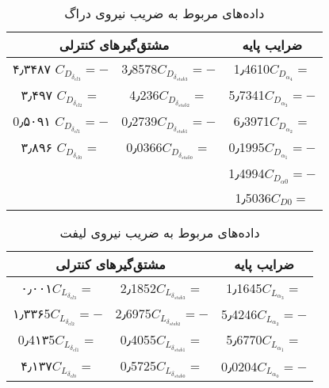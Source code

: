 \begin{table}
	\centering%
	\caption{داده‌های مربوط به ضریب نیروی دراگ}\label{داده‌های مربوط به ضریب نیروی دراگ}
	\begin{tabular}{ |c|c|c| }
		\hline
		\multicolumn{2}{|c|}{مشتق‌گیرهای کنترلی} &ضرایب پایه \\ \hline
		۴٫۳۴۸۷ $C_{D_{\delta_{el3}}}=-$ & 3٫8578$C_{D_{\delta_{stab3}}}=-$ & 1٫4610$C_{D_{\alpha_{4}}}= $\\
		\hline
		۳٫۴۹۷ $C_{D_{\delta_{el2}}}=$ & 4٫236$C_{D_{\delta_{stab2}}}=$& 5٫7341$C_{D_{\alpha_{3}}}=-$\\
		\hline
		0٫۵۰۹۱ $C_{D_{\delta_{el1}}}=-$ & 0٫2739$C_{D_{\delta_{stab1}}}=-$ &6٫3971$C_{D_{\alpha_{2}}}= $\\
		\hline
		۳٫۸۹۶ $C_{D_{\delta_{el0}}}=$  & 0٫0366$C_{D_{\delta_{stab0}}}=$ & 0٫1995$C_{D_{\alpha_{1}}}=-$\\
		\hline
		& & 1٫4994$C_{D_{\alpha0}}=-$\\
		\hline
		& & 1٫5036$C_{D0}=$\\
		\hline
	\end{tabular}
\end{table}
\begin{table}
	\centering%
	\caption{داده‌های مربوط به ضریب نیروی لیفت }\label{داده‌های مربوط به ضریب نیروی لیفت  }
	\begin{tabular}{|c |c|c| }
		\hline
		\multicolumn{2}{|c|}{مشتق‌گیرهای کنترلی} & ضرایب پایه \\ \hline
		۰٫۰۰۱$C_{L_{\delta_{el3}}}=$ & 2٫1852$C_{L_{\delta_{stab3}}}=$& 1٫1645$C_{L_{\alpha_{3}}}=$\\
		\hline
		۱٫۳۳۶5$C_{L_{\delta_{el2}}}=-$ & 2٫6975$C_{L_{\delta_{stab2}}}=-$ &5٫4246$C_{L_{\alpha_{2}}}=-$\\
		\hline
		0٫4۱۳5$C_{L_{\delta_{el1}}}=$ & 0٫4055$C_{L_{\delta_{stab1}}}=$ & 5٫6770$C_{L_{\alpha_{1}}}=$\\
		\hline
		۴٫۱۳۷$ C_{L_{\delta_{el0}}}=$ & 0٫5725$ C_{L_{\delta_{stab0}}}=$ &  0٫0204$C_{L_{\alpha_{0}}}=-$\\
		\hline
	\end{tabular}
\end{table}
